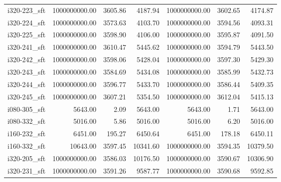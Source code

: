 \begin{tabular}{lrrrrrr}
i320-223\_sft &      1000000000.00 &                3605.86 &          4187.94 &         1000000000.00 &                   3602.65 &             4174.87 \\
i320-224\_sft &      1000000000.00 &                3573.63 &          4103.70 &         1000000000.00 &                   3594.56 &             4093.31 \\
i320-225\_sft &      1000000000.00 &                3598.90 &          4106.00 &         1000000000.00 &                   3595.87 &             4091.50 \\
i320-241\_sft &      1000000000.00 &                3610.47 &          5445.62 &         1000000000.00 &                   3594.79 &             5443.50 \\
i320-242\_sft &      1000000000.00 &                3598.06 &          5428.04 &         1000000000.00 &                   3597.30 &             5429.30 \\
i320-243\_sft &      1000000000.00 &                3584.69 &          5434.08 &         1000000000.00 &                   3585.99 &             5432.73 \\
i320-244\_sft &      1000000000.00 &                3596.77 &          5433.70 &         1000000000.00 &                   3586.44 &             5409.35 \\
i320-245\_sft &      1000000000.00 &                3607.21 &          5354.50 &         1000000000.00 &                   3612.04 &             5415.13 \\
i080-305\_sft &            5643.00 &                   2.09 &          5643.00 &               5643.00 &                      1.71 &             5643.00 \\
i080-332\_sft &            5016.00 &                   5.86 &          5016.00 &               5016.00 &                      6.20 &             5016.00 \\
i160-232\_sft &            6451.00 &                 195.27 &          6450.64 &               6451.00 &                    178.18 &             6450.11 \\
i160-332\_sft &           10643.00 &                3597.45 &         10341.60 &         1000000000.00 &                   3594.35 &            10379.50 \\
i320-205\_sft &      1000000000.00 &                3586.03 &         10176.50 &         1000000000.00 &                   3590.67 &            10306.90 \\
i320-231\_sft &      1000000000.00 &                3591.26 &          9587.77 &         1000000000.00 &                   3590.68 &             9592.85 \\

\end{tabular}
